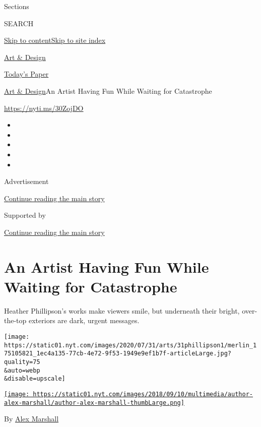 Sections

SEARCH

\protect\hyperlink{site-content}{Skip to
content}\protect\hyperlink{site-index}{Skip to site index}

\href{https://www.nytimes.com/section/arts/design}{Art \& Design}

\href{https://myaccount.nytimes.com/auth/login?response_type=cookie\&client_id=vi}{}

\href{https://www.nytimes.com/section/todayspaper}{Today's Paper}

\href{/section/arts/design}{Art \& Design}\textbar{}An Artist Having Fun
While Waiting for Catastrophe

\url{https://nyti.ms/30ZojDO}

\begin{itemize}
\item
\item
\item
\item
\item
\end{itemize}

Advertisement

\protect\hyperlink{after-top}{Continue reading the main story}

Supported by

\protect\hyperlink{after-sponsor}{Continue reading the main story}

\hypertarget{an-artist-having-fun-while-waiting-for-catastrophe}{%
\section{An Artist Having Fun While Waiting for
Catastrophe}\label{an-artist-having-fun-while-waiting-for-catastrophe}}

Heather Phillipson's works make viewers smile, but underneath their
bright, over-the-top exteriors are dark, urgent messages.

\texttt{[image: https://static01.nyt.com/images/2020/07/31/arts/31phillipson1/merlin\_175105821\_1ec4a135-77cb-4e72-9f53-1949e9ef1b7f-articleLarge.jpg?quality=75\\\&auto=webp\\\&disable=upscale]}

\href{https://www.nytimes.com/by/alex-marshall}{\texttt{[image: https://static01.nyt.com/images/2018/09/10/multimedia/author-alex-marshall/author-alex-marshall-thumbLarge.png]}}

By \href{https://www.nytimes.com/by/alex-marshall}{Alex Marshall}

